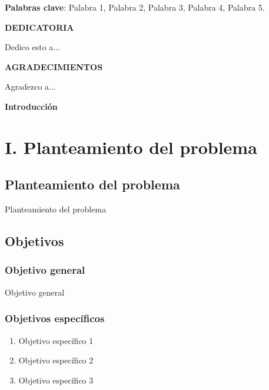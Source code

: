 \documentclass[12pt, letter paper]{report}
\begin{document}
  \textbf{Palabras clave}: Palabra 1, Palabra 2, Palabra 3, Palabra 4, Palabra
  5.
  \newpage
  \begin{center}
    \large \textbf{DEDICATORIA}
  \end{center}

  Dedico esto a...

  \newpage
  \begin{center}
    \Large \textbf{AGRADECIMIENTOS}
  \end{center}

  Agradezco a...

  \tableofcontents

  \newpage
  \begin{center}
    \Large \textbf{Introducción}
  \end{center}

  \chapter{I. Planteamiento del problema} %
  \label{cha:i_planteamiento_del_problema}
    \section{Planteamiento del problema} %
    \label{sec:planteamiento_del_problema}
        Planteamiento del problema

    \section{Objetivos} %
    \label{sec:objetivos}
      \subsection{Objetivo general} %
      \label{sub:objetivo_general}
        Objetivo general

      \subsection{Objetivos específicos} %
      \label{sub:objetivos_específicos}
        \begin{enumerate}
          \item Objetivo específico 1
          \item Objetivo específico 2
          \item Objetivo específico 3
        \end{enumerate}
\end{document}

